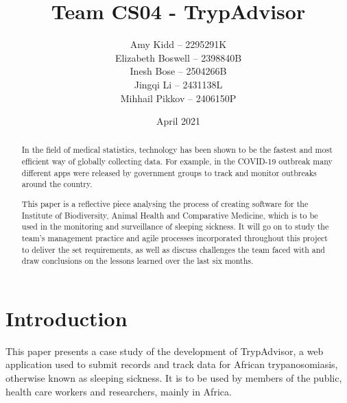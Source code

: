 \documentclass{l3proj}
\begin{document}
\title{Team CS04 - TrypAdvisor}

\author{Amy Kidd -- 2295291K\\
        Elizabeth Boswell -- 2398840B\\
        Inesh Bose -- 2504266B\\
        Jingqi Li -- 2431138L\\
        Mihhail Pikkov -- 2406150P}

\date{April 2021}

\maketitle

\begin{abstract}
\normalsize In the field of medical statistics, technology has been shown to be the fastest and most efficient way of globally collecting data. For example, in the COVID-19 outbreak many different apps were released by government groups to track and monitor outbreaks around the country.

This paper is a reflective piece analysing the process of creating software for the Institute of Biodiversity, Animal Health and Comparative Medicine, which is to be used in the monitoring and surveillance of sleeping sickness. It will go on to study the team's management practice and agile processes incorporated throughout this project to deliver the set requirements, as well as discuss challenges the team faced with and draw conclusions on the lessons learned over the last six months.
\end{abstract}

\educationalconsent


\newpage

\section{Introduction}
This paper presents a case study of the development of TrypAdvisor, a web application used to submit records and track data for African trypanosomiasis, otherwise known as sleeping sickness. It is to be used by members of the public, health care workers and researchers, mainly in Africa.
\end{document}

